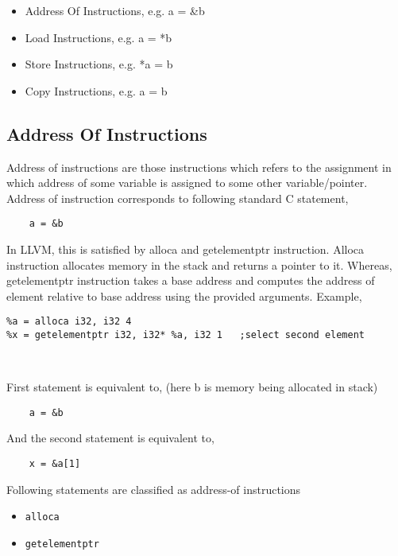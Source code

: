 \documentclass[a4paper,11pt]{report}
\begin{document}
\begin{itemize}
    \item Address Of Instructions, e.g. a = \&b
    \item Load Instructions, e.g.  a = *b
    \item Store Instructions, e.g. *a = b
    \item Copy Instructions, e.g. a = b
\end{itemize}

\subsection{Address Of Instructions}
Address of instructions are those instructions which refers to the assignment 
in which address of some variable is assigned to some other variable/pointer.
Address of instruction corresponds to following standard C statement,
    
\begin{lstlisting}
    a = &b
\end{lstlisting}

In LLVM, this is satisfied by alloca and getelementptr instruction.
Alloca instruction allocates memory in the stack and returns a pointer to it.
Whereas, getelementptr instruction takes a base address and computes the address
of element relative to base address using the provided arguments.
Example,

\begin{verbatim}
%a = alloca i32, i32 4
%x = getelementptr i32, i32* %a, i32 1   ;select second element                 
 
                       
\end{verbatim}

\noindent
First statement is equivalent to, (here b is memory being allocated in stack)

\begin{lstlisting}
    a = &b
\end{lstlisting}

\noindent
And the second statement is equivalent to,
\begin{lstlisting}
    x = &a[1]
\end{lstlisting}

\noindent
Following statements are classified as address-of instructions
\begin{itemize}
    \item \texttt{alloca}
    \item \texttt{getelementptr}
\end{itemize}
\end{document}
